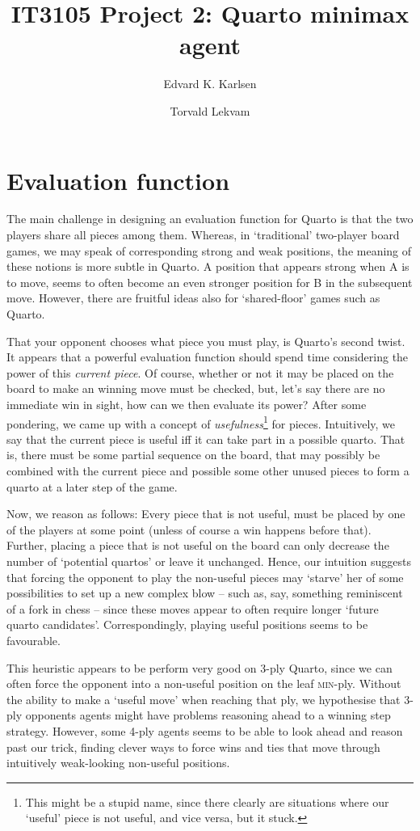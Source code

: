 \documentclass[a4paper,9pt]{article}
\author{
  Edvard K. Karlsen\\
  \and
  Torvald Lekvam
}
\title{IT3105 Project 2: Quarto minimax agent}
\date {}
\begin{document}
\maketitle

\section{Evaluation function}
The main challenge in designing an evaluation function for Quarto is that the
two players share all pieces among them. Whereas, in `traditional' two-player
board games, we may speak of corresponding strong and weak positions, the
meaning of these notions is more subtle in Quarto. A position that appears
strong when A is to move, seems to often become an even stronger position for B
in the subsequent move.  However, there are fruitful ideas also for
`shared-floor' games such as Quarto.

That your opponent chooses what piece you must play, is Quarto's second twist.
It appears that a powerful evaluation function should spend time considering
the power of this \emph{current piece}. Of course, whether or not it may be
placed on the board to make an winning move must be checked, but, let's say
there are no immediate win in sight, how can we then evaluate its power?  After
some pondering, we came up with a concept of \emph{usefulness}\footnote{This
might be a stupid name, since there clearly are situations where our `useful'
piece is not useful, and vice versa, but it stuck.} for pieces. Intuitively, we
say that the current piece is useful iff it can take part in a possible quarto.
That is, there must be some partial sequence on the board, that may possibly be
combined with the current piece and possible some other unused pieces to form a
quarto at a later step of the game.

Now, we reason as follows: Every piece that is not useful, must be placed by
one of the players at some point (unless of course a win happens before that).
Further, placing a piece that is not useful on the board can only decrease the
number of `potential quartos' or leave it unchanged. Hence, our intuition
suggests that forcing the opponent to play the non-useful pieces may `starve'
her of some possibilities to set up a new complex blow -- such as, say,
something reminiscent of a fork in chess -- since these moves appear to often
require longer `future quarto candidates'. Correspondingly, playing useful
positions seems to be favourable.

This heuristic appears to be perform very good on 3-ply Quarto, since we can
often force the opponent into a non-useful position on the leaf
\textsc{min}-ply. Without the ability to make a `useful move' when reaching
that ply, we hypothesise that 3-ply opponents agents might have problems
reasoning ahead to a winning step strategy. However, some 4-ply agents seems to
be able to look ahead and reason past our trick, finding clever ways to force
wins and ties that move through intuitively weak-looking non-useful positions. 
\end{document}

